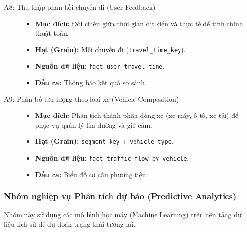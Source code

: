 \begin{description}
    \item[A8: Thu thập phản hồi chuyến đi (User Feedback)]\hfill
    \begin{itemize}
        \item \textbf{Mục đích:} Đối chiếu giữa thời gian dự kiến và thực tế để tinh chỉnh thuật toán.
        \item \textbf{Hạt (Grain):} Mỗi chuyến đi (\texttt{travel\_time\_key}).
        \item \textbf{Nguồn dữ liệu:} \texttt{fact\_user\_travel\_time}.
        \item \textbf{Đầu ra:} Thông báo kết quả so sánh.
    \end{itemize}

    \item[A9: Phân bố lưu lượng theo loại xe (Vehicle Composition)]\hfill
    \begin{itemize}
        \item \textbf{Mục đích:} Phân tích thành phần dòng xe (xe máy, ô tô, xe tải) để phục vụ quản lý làn đường và giờ cấm.
        \item \textbf{Hạt (Grain):} \texttt{segment\_key} + \texttt{vehicle\_type}.
        \item \textbf{Nguồn dữ liệu:} \texttt{fact\_traffic\_flow\_by\_vehicle}.
        \item \textbf{Đầu ra:} Biểu đồ cơ cấu phương tiện.
    \end{itemize}
\end{description}

\subsubsection{Nhóm nghiệp vụ Phân tích dự báo (Predictive Analytics)}

Nhóm này sử dụng các mô hình học máy (Machine Learning) trên nền tảng dữ liệu lịch sử để dự đoán trạng thái tương lai.

